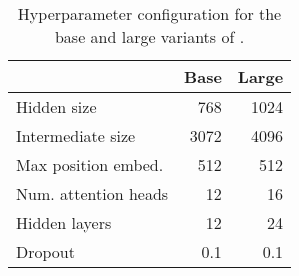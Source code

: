 \documentclass{../acl_latex.tex}
\begin{document}
\begin{table}[t]
\centering
\begin{tabular}{lrr}
\toprule
                     & Base     & Large  \\ \midrule
Hidden size          & 768      & 1024   \\ 
Intermediate size    & 3072     & 4096   \\
Max position embed.  & 512      & 512    \\
Num. attention heads & 12       & 16     \\
Hidden layers        & 12       & 24     \\
Dropout              & 0.1      & 0.1    \\ \bottomrule
\end{tabular}
\caption{
    Hyperparameter configuration for the base and large variants of \libertus{}.
}
\label{table:pretrain_hyperparams}
\end{table}
\end{document}
